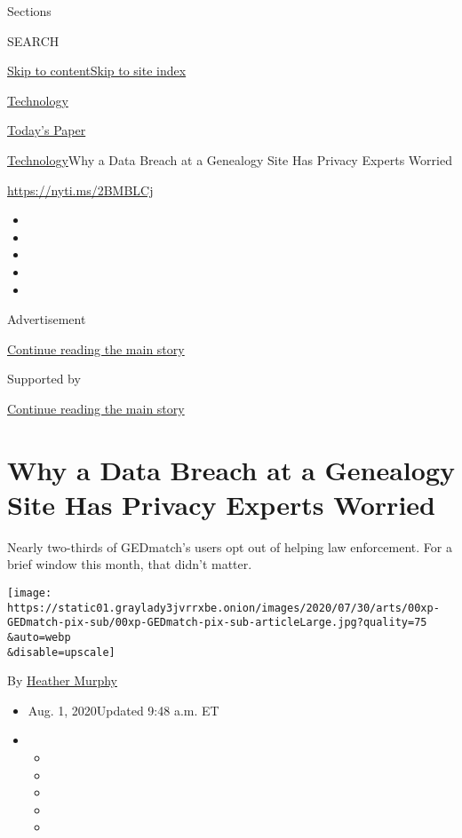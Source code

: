 Sections

SEARCH

\protect\hyperlink{site-content}{Skip to
content}\protect\hyperlink{site-index}{Skip to site index}

\href{https://www.nytimes3xbfgragh.onion/section/technology}{Technology}

\href{https://myaccount.nytimes3xbfgragh.onion/auth/login?response_type=cookie\&client_id=vi}{}

\href{https://www.nytimes3xbfgragh.onion/section/todayspaper}{Today's
Paper}

\href{/section/technology}{Technology}\textbar{}Why a Data Breach at a
Genealogy Site Has Privacy Experts Worried

\url{https://nyti.ms/2BMBLCj}

\begin{itemize}
\item
\item
\item
\item
\item
\end{itemize}

Advertisement

\protect\hyperlink{after-top}{Continue reading the main story}

Supported by

\protect\hyperlink{after-sponsor}{Continue reading the main story}

\hypertarget{why-a-data-breach-at-a-genealogy-site-has-privacy-experts-worried}{%
\section{Why a Data Breach at a Genealogy Site Has Privacy Experts
Worried}\label{why-a-data-breach-at-a-genealogy-site-has-privacy-experts-worried}}

Nearly two-thirds of GEDmatch's users opt out of helping law
enforcement. For a brief window this month, that didn't matter.

\texttt{[image: https://static01.graylady3jvrrxbe.onion/images/2020/07/30/arts/00xp-GEDmatch-pix-sub/00xp-GEDmatch-pix-sub-articleLarge.jpg?quality=75\\\&auto=webp\\\&disable=upscale]}

By \href{https://www.nytimes3xbfgragh.onion/by/heather-murphy}{Heather
Murphy}

\begin{itemize}
\item
  Aug. 1, 2020Updated 9:48 a.m. ET
\item
  \begin{itemize}
  \item
  \item
  \item
  \item
  \item
  \end{itemize}
\end{itemize}

